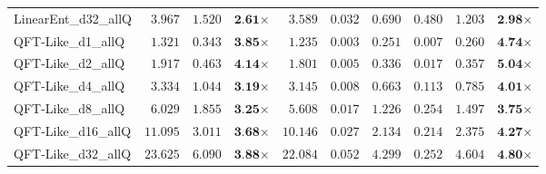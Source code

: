 \begin{table*}[t]
{\begin{tabular}{| l || r r c || r r r r r c |}
LinearEnt\_d32\_allQ & $3.967$ & $1.520$ & $\textbf{2.61}$$\times$ & $3.589$ & $0.032$ & $0.690$ & $0.480$ & $1.203$ & $\textbf{2.98}$$\times$ \\
QFT-Like\_d1\_allQ & $1.321$ & $0.343$ & $\textbf{3.85}$$\times$ & $1.235$ & $0.003$ & $0.251$ & $0.007$ & $0.260$ & $\textbf{4.74}$$\times$ \\
QFT-Like\_d2\_allQ & $1.917$ & $0.463$ & $\textbf{4.14}$$\times$ & $1.801$ & $0.005$ & $0.336$ & $0.017$ & $0.357$ & $\textbf{5.04}$$\times$ \\
QFT-Like\_d4\_allQ & $3.334$ & $1.044$ & $\textbf{3.19}$$\times$ & $3.145$ & $0.008$ & $0.663$ & $0.113$ & $0.785$ & $\textbf{4.01}$$\times$ \\
QFT-Like\_d8\_allQ & $6.029$ & $1.855$ & $\textbf{3.25}$$\times$ & $5.608$ & $0.017$ & $1.226$ & $0.254$ & $1.497$ & $\textbf{3.75}$$\times$ \\
QFT-Like\_d16\_allQ & $11.095$ & $3.011$ & $\textbf{3.68}$$\times$ & $10.146$ & $0.027$ & $2.134$ & $0.214$ & $2.375$ & $\textbf{4.27}$$\times$ \\
QFT-Like\_d32\_allQ & $23.625$ & $6.090$ & $\textbf{3.88}$$\times$ & $22.084$ & $0.052$ & $4.299$ & $0.252$ & $4.604$ & $\textbf{4.80}$$\times$ \\
\hline
\end{tabular}
}
\end{table*}

